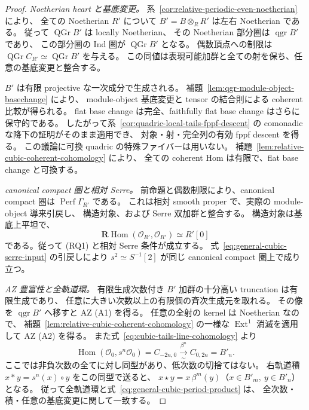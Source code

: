 \begin{proof}
\emph{Noetherian heart と基底変更。}
系~\ref{cor:relative-periodic-even-noetherian} により、
全ての Noetherian $R'$ について $B'=B\otimes_RR'$ は左右 Noetherian である。
従って $\operatorname{QGr}B'$ は locally Noetherian、
その Noetherian 部分圏は $\operatorname{qgr}B'$ であり、
この部分圏の Ind 圏が $\operatorname{QGr}B'$ となる。
偶数頂点への制限は
$\operatorname{QGr}C_{R'}\simeq\operatorname{QGr}B'$ を与える。
この同値は表現可能加群と全ての射を保ち、任意の基底変更と整合する。

$B'$ は有限 projective な一次成分で生成される。
補題~\ref{lem:qgr-module-object-basechange} により、
module-object 基底変更と tensor の結合則による coherent 比較が得られる。
flat base change は完全、faithfully flat base change はさらに保守的である。
したがって系~\ref{cor:quadric-local-tails-fppf-descent} の
comonadic な降下の証明がそのまま適用でき、
対象・射・完全列の有効 fppf descent を得る。
この議論に可換 quadric の特殊ファイバーは用いない。
補題~\ref{lem:relative-cubic-coherent-cohomology} により、
全ての coherent Hom は有限で、flat base change と可換する。

\emph{canonical compact 圏と相対 Serre。}
前命題と偶数制限により、canonical compact 圏は
$\operatorname{Perf}\Gamma_{R'}$ である。
これは相対 smooth proper で、実際の module-object 導来引戻し、
構造対象、および Serre 双加群と整合する。
構造対象は基底上平坦で、
\[
 \mathbf R\operatorname{Hom}(\mathcal O_{R'},\mathcal O_{R'})
       \simeq R'[0]
\]
である。従って (RQ1) と相対 Serre 条件が成立する。
式~\eqref{eq:general-cubic-serre-input} の引戻しにより
$s^2\simeq S^{-1}[2]$ が同じ canonical compact 圏上で成り立つ。

\emph{AZ 豊富性と全軌道環。}
有限生成次数付き $B'$ 加群の十分高い truncation は有限生成であり、
任意に大きい次数以上の有限個の斉次生成元を取れる。
その像を $\operatorname{qgr}B'$ へ移すと AZ (A1) を得る。
任意の全射の kernel は Noetherian なので、
補題~\ref{lem:relative-cubic-coherent-cohomology} の一様な
$\operatorname{Ext}^1$ 消滅を適用して AZ (A2) を得る。
また式~\eqref{eq:cubic-tails-line-cohomology} より
\[
 \operatorname{Hom}(\mathcal O_0,s^n\mathcal O_0)
       =C_{-2n,0}\xrightarrow[\sim]{\beta^n}C_{0,2n}=B'_n .
\]
ここでは非負次数の全てに対し同型があり、低次数の切捨てはない。
右軌道積 $x*y=s^n(x)\circ y$ をこの同型で送ると、
$x\star y=x\,\beta^m(y)$（$x\in B'_m,\ y\in B'_n$）となる。
従って全軌道環と式~\eqref{eq:general-cubic-period-product} は、
全次数・積・任意の基底変更に関して一致する。


\end{proof}
